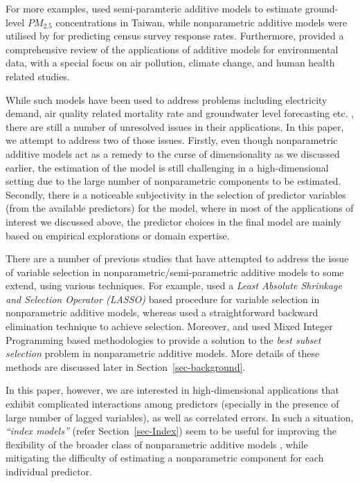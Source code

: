 \documentclass[11pt,a4paper,]{article}
\begin{document}
For more examples, \textcite{Ho2020} used semi-paramteric additive
models to estimate ground-level \(PM_{2.5}\) concentrations in Taiwan,
while nonparametric additive models were utilised by
\textcite{Ibrahim2021} for predicting census survey response rates.
Furthermore, \textcite{Ravindra2019} provided a comprehensive review of
the applications of additive models for environmental data, with a
special focus on air pollution, climate change, and human health related
studies.

While such models have been used to address problems including
electricity demand, air quality related mortality rate and groundwater
level forecasting etc.
\autocite{FH2012,HF2010,Wood2017,Peterson2014,Rajaee2019}, there are
still a number of unresolved issues in their applications. In this
paper, we attempt to address two of those issues. Firstly, even though
nonparametric additive models act as a remedy to the curse of
dimensionality as we discussed earlier, the estimation of the model is
still challenging in a high-dimensional setting due to the large number
of nonparametric components to be estimated. Secondly, there is a
noticeable subjectivity in the selection of predictor variables (from
the available predictors) for the model, where in most of the
applications of interest we discussed above, the predictor choices in
the final model are mainly based on empirical explorations or domain
expertise.

There are a number of previous studies that have attempted to address
the issue of variable selection in nonparametric/semi-parametric
additive models to some extend, using various techniques. For example,
\textcite{Huang2010} used a \emph{Least Absolute Shrinkage and Selection
Operator (LASSO)} \autocite{Tibshirani1996} based procedure for variable
selection in nonparametric additive models, whereas \textcite{FH2012}
used a straightforward backward elimination technique to achieve
selection. Moreover, \textcite{Ibrahim2021} and \textcite{Hazimeh2023}
used Mixed Integer Programming based methodologies to provide a solution
to the \emph{best subset selection} problem in nonparametric additive
models. More details of these methods are discussed later in
Section~\ref{sec-background}.

In this paper, however, we are interested in high-dimensional
applications that exhibit complicated interactions among predictors
(specially in the presence of large number of lagged variables), as well
as correlated errors. In such a situation, \emph{``index models''}
(refer Section~\ref{sec-Index}) seem to be useful for improving the
flexibility of the broader class of nonparametric additive models
\autocite{Radchenko2015}, while mitigating the difficulty of estimating
a nonparametric component for each individual predictor.
\end{document}
